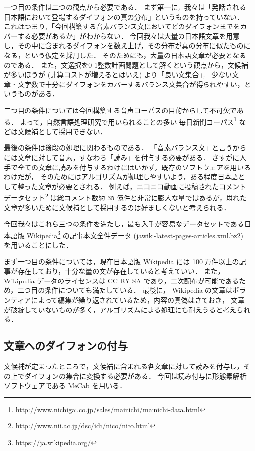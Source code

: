 \documentclass[final,10pt,twocolumn,3p,times,fleqn]{elsarticle}
\begin{document}
  一つ目の条件は二つの観点から必要である．
  まず第一に，我々は「発話される日本語において登場するダイフォンの真の分布」というものを持っていない．
  これはつまり，「今回構築する音素バランス文においてどのダイフォンまでをカバーする必要があるか」がわからない．
  今回我々は大量の日本語文章を用意し，その中に含まれるダイフォンを数え上げ，その分布が真の分布に似たものになる，という仮定を採用した．
  そのためにも，大量の日本語文章が必要となるのである．
  また，文選択を0-1整数計画問題として解くという観点から，文候補が多いほうが (計算コストが増えるとはいえ) より「良い文集合」，
  少ない文章・文字数で十分にダイフォンをカバーするバランス文集合が得られやすい，というものがある．

  二つ目の条件については今回構築する音声コーパスの目的からして不可欠である．
  よって，自然言語処理研究で用いられることの多い
  毎日新聞コーパス\footnote{http://www.nichigai.co.jp/sales/mainichi/mainichi-data.html} などは文候補として採用できない．

  最後の条件は後段の処理に関わるものである．
  「音素バランス文」と言うからには文章に対して音素，すなわち「読み」を付与する必要がある．
  さすがに人手で全ての文章に読みを付与するわけにはいかず，既存のソフトウェアを用いるわけだが，
  そのためにはアルゴリズムが処理しやすいよう，ある程度日本語として整った文章が必要とされる．
  例えば，ニコニコ動画に投稿されたコメントデータセット\footnote{http://www.nii.ac.jp/dsc/idr/nico/nico.html}
  は総コメント数約 35 億件と非常に膨大な量ではあるが，崩れた文章が多いために文候補として採用するのは好ましくないと考えられる．

  今回我々はこれら三つの条件を満たし，最も入手が容易なデータセットである日本語版 Wikipedia\footnote{https://ja.wikipedia.org/}
  の記事本文全件データ (jawiki-latest-pages-articles.xml.bz2) を用いることにした．

  まず一つ目の条件については，現在日本語版 Wikipedia には 100 万件以上の記事が存在しており，十分な量の文が存在していると考えていい．
  また， Wikipedia データのライセンスは CC-BY-SA であり，二次配布が可能であるため，二つ目の条件についても満たしている．
  最後に， Wikipedia の文章はボランティアによって編集が繰り返されているため，内容の真偽はさておき，
  文章が破綻していないものが多く，アルゴリズムによる処理にも耐えうると考えられる．

  \subsection{文章へのダイフォンの付与}
  文候補が定まったところで，文候補に含まれる各文章に対して読みを付与し，その上でダイフォンの集合に変換する必要がある．
  今回は読み付与に形態素解析ソフトウェアである MeCab\cite{mecab} を用いる．
\end{document}
